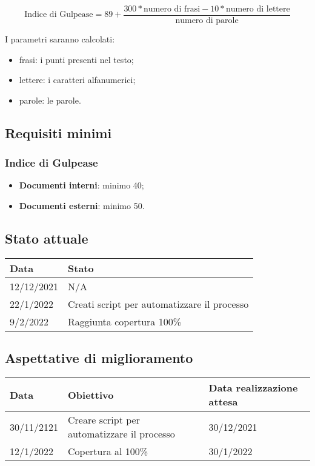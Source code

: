 \documentclass[a4paper, 12pt]{article}
\begin{document}
\[ \text{Indice di Gulpease} = 89 + \frac{300*\text{numero di frasi} - 10*\text{numero di lettere}}{\text{numero di parole}} \]

I parametri saranno calcolati:
\begin{itemize}
	\item frasi: i punti presenti nel testo;
	\item lettere: i caratteri alfanumerici;
	\item parole: le parole.
\end{itemize}

\subsection{Requisiti minimi}
\subsubsection{Indice di Gulpease}
\begin{itemize}
	\item \textbf{Documenti interni}: minimo 40;
	\item \textbf{Documenti esterni}: minimo 50.
\end{itemize}

\subsection{Stato attuale}
\begin{tabular}{|l|l|}\hline
	Data & Stato \\\hline
	12/12/2021 & N/A \\\hline
	22/1/2022 & Creati script per automatizzare il processo\\\hline
	9/2/2022 & Raggiunta copertura 100\%\\\hline
\end{tabular}

\subsection{Aspettative di miglioramento}
\begin{tabular}{|l|l|l|}\hline
	Data & Obiettivo & Data realizzazione attesa \\\hline
	30/11/2121 & Creare script per automatizzare il processo & 30/12/2021\\\hline
	12/1/2022 & Copertura al 100\% & 30/1/2022\\\hline
\end{tabular}
\end{document}
